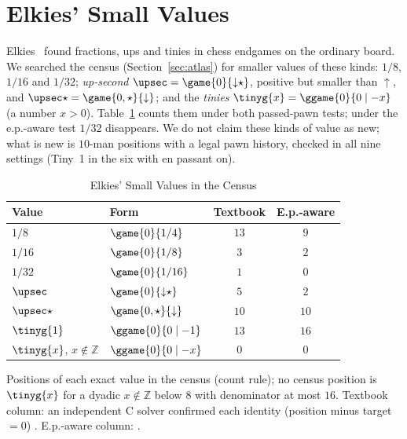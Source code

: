 \section{Elkies' Small Values}\label{sec:targets}

Elkies~\cite{Elkies1996} found fractions, ups and tinies in chess endgames on the ordinary board. We searched
the census (Section~\ref{sec:atlas}) for smaller values of these kinds: $1/8$, $1/16$ and $1/32$;
\emph{up-second} $\upsec=\game{0}{{\downarrow}\star}$, positive but smaller than ${\uparrow}$, and
$\upsec\star=\game{0,\star}{{\downarrow}}$; and the \emph{tinies} $\tinyg{x}=\ggame{0}{0\mid -x}$ (a number $x>0$).
Table~\ref{tab:targets} counts them under both passed-pawn tests; under the e.p.-aware test $1/32$
disappears. We do not claim these kinds of value as new; what is new is $10$-man positions with a legal pawn
history, checked in all nine settings (Tiny~1 in the six with en passant on).

\begin{table}[!t]
\caption{Elkies' Small Values in the Census}
\label{tab:targets}
\centering
\begin{tabular}{@{}llcc@{}}
\toprule
Value & Form & Textbook & E.p.-aware \\
\midrule
$1/8$ & $\game{0}{1/4}$ & $13$ & $9$ \\
$1/16$ & $\game{0}{1/8}$ & $3$ & $2$ \\
$1/32$ & $\game{0}{1/16}$ & $1$ & $0$ \\
$\upsec$ & $\game{0}{{\downarrow}\star}$ & $5$ & $2$ \\
$\upsec\star$ & $\game{0,\star}{{\downarrow}}$ & $10$ & $10$ \\
$\tinyg{1}$ & $\ggame{0}{0\mid -1}$ & $13$ & $16$ \\
$\tinyg{x}$, $x\notin\mathbb{Z}$ & $\ggame{0}{0\mid -x}$ & $0$ & $0$ \\
\bottomrule
\end{tabular}

\smallskip
\parbox{\columnwidth}{\footnotesize Positions of each exact value in the census (count rule); no census position is $\tinyg{x}$ for a dyadic $x\notin\mathbb{Z}$ below $8$ with denominator at most $16$. Textbook
column: an independent C solver confirmed each identity (position minus target $=0$) . E.p.-aware
column: .}
\end{table}

